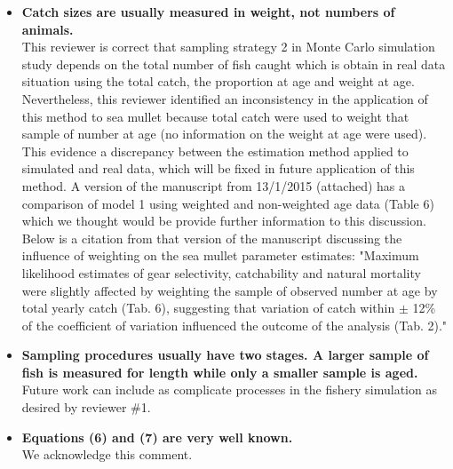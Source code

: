 \documentclass[11pt]{article}
\begin{document}
\begin{spacing}{1.2}
\begin{itemize}
\item {\bf Catch sizes are usually measured in weight, not numbers of animals.} \\
This reviewer is correct that sampling strategy 2 in Monte Carlo simulation study depends on the total number of fish caught which is obtain in real data situation using the total catch, the proportion at age and weight at age. Nevertheless, this reviewer identified an inconsistency in the application of this method to sea mullet because total catch were used to weight that sample of number at age (no information on the weight at age were used). This evidence a discrepancy between the estimation method applied to simulated and real data, which will be fixed in future application of this method. A version of the manuscript from 13/1/2015 (attached) has a comparison of model 1 using weighted and non-weighted age data (Table 6) which we thought would be provide further information to this discussion. Below is a citation from that version of the manuscript discussing the influence of weighting on the sea mullet parameter estimates: 
"Maximum likelihood estimates of gear selectivity, catchability and natural mortality were slightly affected by weighting the sample of observed number at age by total yearly catch (Tab. 6), suggesting that variation of catch within $\pm$ 12\% of the coefficient of variation influenced the outcome of the analysis (Tab. 2)."
 \\

\item {\bf Sampling procedures usually have two stages.  A larger sample of fish is measured for length while only a smaller sample is aged.} \\
Future work can include as complicate processes in the fishery simulation as desired by reviewer \#1.\\

\item {\bf Equations (6) and (7) are very well known. } \\
We acknowledge this comment. \\


\end{itemize}
\end{spacing}
\end{document}
